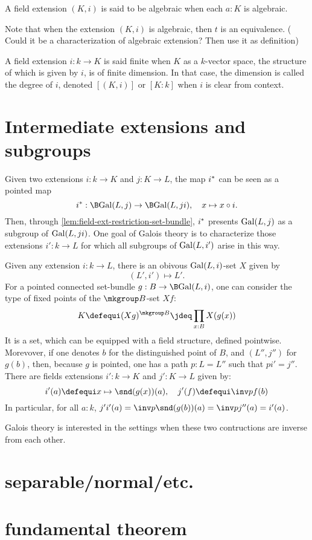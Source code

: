 \begin{definition}
  A field extension $(K,i)$ is said to be algebraic when each $a:K$ is algebraic.
  \label{defn:algebraic-extension}
\end{definition}

Note that when the extension $(K,i)$ is algebraic, then $t$ is an equivalence.
({\color{red} Could it be a characterization of algebraic extension? Then use
it as definition})

\begin{definition}
  A field extension $i:k\to K$ is said finite when $K$ as a
  $k$-vector space, the structure of which is given by $i$, is of finite dimension.
  In that case, the dimension is called the degree of $i$, denoted $[(K,i)]$ or $[K:k]$ when $i$ is clear from context.
  \label{defn:degree-field-extension}
\end{definition} 

\section{Intermediate extensions and subgroups}
%
Given two extensions $i: k \to K$ and $j: K \to L$, the map ${{i}^\ast}$ can be seen as a pointed map
\begin{displaymath}
  \restr i: \B\Gal(L,j) \to \B\Gal(L,ji),\quad x\mapsto x\circ i.
\end{displaymath}
Then, through \cref{lem:field-ext-restriction-set-bundle}, ${{i}^\ast}$ presents
$\mathrm{Gal}(L,j)$ as a subgroup of $\mathrm{Gal}(L,ji)$. One goal of Galois theory is to
characterize those extensions $i':k \to L$ for which all subgroups of
$\mathrm{Gal}(L,i')$ arise in this way. 

Given any extension $i:k \to L$, there is an obivous $\mathrm{Gal}(L,i)$-set $X$ given by 
\begin{displaymath}
  (L',i') \mapsto L'.
\end{displaymath}
For a pointed connected set-bundle $g:B \to \B \Gal(L,i)$, one can consider the
type of fixed points of the $\mkgroup B$-set $Xf$:
\begin{displaymath}
  K \defequi (Xg)^{\mkgroup B} \jdeq \prod_{x:B}X(g(x))
\end{displaymath}
It is a set, which can be equipped with a field structure, defined pointwise.
Morevover, if one denotes $b$ for the distinguished point of $B$, and $(L'',j'')$ for $g(b)$, then, because $g$ is pointed, one has a path $p:L=L''$ such that $pi'=j''$. There are
fields extensions $i':k \to K$ and $j':K \to L$ given by:
\begin{displaymath}
  i'(a) \defequi x\mapsto \snd(g(x))(a),\quad
  j'(f) \defequi \inv p f(b)
\end{displaymath}
In particular, for all $a:k$, $j'i'(a) = \inv p \snd(g(b))(a) = \inv p j''(a) = i'(a)$.

Galois theory is interested in the settings when these two contructions are inverse from each other.

\section{separable/normal/etc.}
\label{sec:cover-spac-fields-1}

\section{fundamental theorem}
\label{sec:fundamental-theorem}



